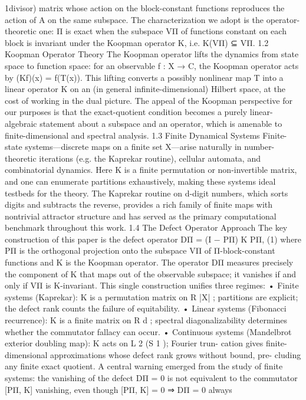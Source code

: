 1divisor) matrix whose action on the block-constant functions reproduces the action of A on the
same subspace. The characterization we adopt is the operator-theoretic one: Π is exact when the
subspace VΠ of functions constant on each block is invariant under the Koopman operator K, i.e.
K(VΠ) ⊆ VΠ.
1.2 Koopman Operator Theory
The Koopman operator lifts the dynamics from state space to function space: for an observable
f : X → C, the Koopman operator acts by (Kf)(x) = f(T(x)). This lifting converts a possibly
nonlinear map T into a linear operator K on an (in general infinite-dimensional) Hilbert space, at
the cost of working in the dual picture. The appeal of the Koopman perspective for our purposes
is that the exact-quotient condition becomes a purely linear-algebraic statement about a subspace
and an operator, which is amenable to finite-dimensional and spectral analysis.
1.3 Finite Dynamical Systems
Finite-state systems—discrete maps on a finite set X—arise naturally in number-theoretic iterations
(e.g. the Kaprekar routine), cellular automata, and combinatorial dynamics. Here K is a finite
permutation or non-invertible matrix, and one can enumerate partitions exhaustively, making these
systems ideal testbeds for the theory. The Kaprekar routine on d-digit numbers, which sorts digits
and subtracts the reverse, provides a rich family of finite maps with nontrivial attractor structure
and has served as the primary computational benchmark throughout this work.
1.4 The Defect Operator Approach
The key construction of this paper is the defect operator
DΠ = (I − PΠ) K PΠ, (1)
where PΠ is the orthogonal projection onto the subspace VΠ of Π-block-constant functions and K
is the Koopman operator. The operator DΠ measures precisely the component of K that maps out
of the observable subspace; it vanishes if and only if VΠ is K-invariant. This single construction
unifies three regimes:
• Finite systems (Kaprekar): K is a permutation matrix on R
|X|
; partitions are explicit; the
defect rank counts the failure of equitability.
• Linear systems (Fibonacci recurrence): K is a finite matrix on R
d
; spectral diagonalizability
determines whether the commutator fallacy can occur.
• Continuous systems (Mandelbrot exterior doubling map): K acts on L
2
(S
1
); Fourier trun-
cation gives finite-dimensional approximations whose defect rank grows without bound, pre-
cluding any finite exact quotient.
A central warning emerged from the study of finite systems: the vanishing of the defect DΠ = 0
is not equivalent to the commutator [PΠ, K] vanishing, even though [PΠ, K] = 0 ⇒ DΠ = 0 always
